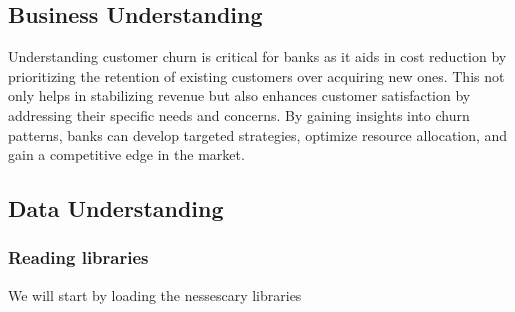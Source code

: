 \documentclass[
  letterpaper,
  DIV=11,
  numbers=noendperiod]{scrartcl}
\begin{document}
\subsection{Business Understanding}\label{business-understanding}

Understanding customer churn is critical for banks as it aids in cost
reduction by prioritizing the retention of existing customers over
acquiring new ones. This not only helps in stabilizing revenue but also
enhances customer satisfaction by addressing their specific needs and
concerns. By gaining insights into churn patterns, banks can develop
targeted strategies, optimize resource allocation, and gain a
competitive edge in the market.

\subsection{Data Understanding}\label{data-understanding}

\subsubsection{Reading libraries}\label{reading-libraries}

We will start by loading the nessescary libraries
\end{document}
